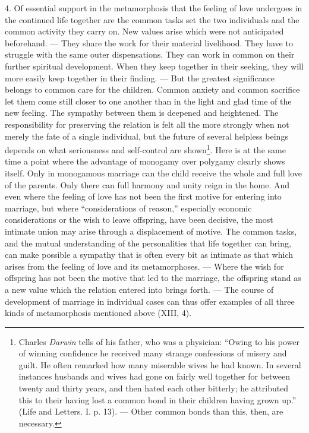 \documentclass[12pt,a4paper,openany]{book}
\newcommand{\opage}[1]{\marginnote{\footnotesize\textit{[#1]}}}
\begin{document}
4. Of essential support in the metamorphosis that the feeling of love undergoes in the continued life together are the
common tasks set the two individuals and the common activity they carry on. New values arise which were not
anticipated beforehand. --- They share the work for their material livelihood. They have to struggle with the same outer
dispensations. They can work in common on their further spiritual development. When they keep together in their
seeking, they will more easily keep together in their finding. --- But the greatest significance belongs to common care
for the children. Common anxiety and common sacrifice let them come still closer to one another than in the light and
glad time of the new feeling. The sympathy between them is deepened and heightened. The responsibility for preserving
the relation is felt all the more strongly when not merely the fate of a single individual, but the future of several
helpless beings depends on what seriousness and self-control are shown\footnote[1]{Charles \emph{Darwin} tells of his
father, who was a physician: ``Owing to his power of winning confidence he received many strange confessions of misery
and guilt. He often remarked how many miserable wives he had known. In several instances husbands and wives had gone on
fairly well together for between twenty and thirty years, and then hated each other bitterly; he attributed this to
their having lost a common bond in their children having grown up.''%
(Life and Letters. I. p. 13). --- Other common bonds than this, then, are necessary.}.
\opage{294}Here is at the same time a point where the advantage of monogamy over polygamy clearly shows itself. Only in
monogamous marriage can the child receive the whole and full love of the parents. Only there can full harmony and unity
reign in the home. And even where the feeling of love has not been the first motive for entering into marriage, but
where ``considerations of reason,'' especially economic considerations or the wish to leave offspring, have been
decisive, the most intimate union may arise through a displacement of motive. The common tasks, and the mutual
understanding of the personalities that life together can bring, can make possible a sympathy that is often every bit
as intimate as that which arises from the feeling of love and its metamorphoses. --- Where the wish for offspring has
not been the motive that led to the marriage, the offspring stand as a new value which the relation entered into
brings forth. --- The course of development of marriage in individual cases can thus offer examples of all three kinds
of metamorphosis mentioned above (XIII, 4).
\end{document}

